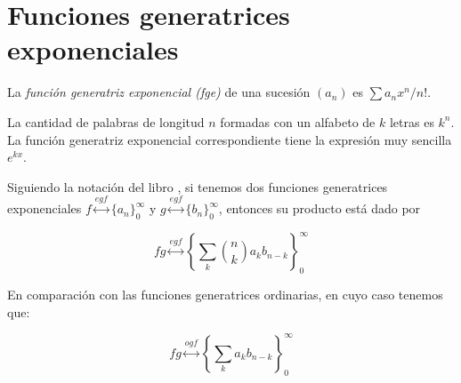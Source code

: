 \section{Funciones generatrices
exponenciales}
\label{%
section-funciones-generatrices-exponenciales}
\begin{definition}
\label{definition-combi-008}
La \emph{función generatriz exponencial
(fge)} de una sucesión $(a_n)$ es $ \sum
a_{n}x^{n}/n!$.
\end{definition}
\begin{example}
\label{example-combi-003}
La cantidad de palabras de longitud $n$
formadas con un alfabeto de $k$ letras es
$k^n$. La función generatriz exponencial
correspondiente tiene la expresión muy
sencilla $e^{kx}$.
\end{example}
\begin{theorem}
\label{rule3p}
Siguiendo la notación del libro
\cite{generatingfunctionology}, si tenemos
dos funciones generatrices exponenciales
$f
\overset{egf}{\longleftrightarrow}
\{a_n\}_0^\infty$
y
$g
\overset{egf}{\longleftrightarrow}
\{b_n\}_0^\infty$,
entonces su producto está dado por

$$
fg
\overset{egf}{\longleftrightarrow} \left\{
\sum_k{n \choose k}a_kb_{n-k}
\right\}_0^\infty
$$

\end{theorem}
En comparación con las funciones generatrices
ordinarias, en cuyo caso tenemos que:

$$
fg
\overset{ogf}{\longleftrightarrow} \left\{
\sum_ka_kb_{n-k} \right\}_0^\infty
$$


